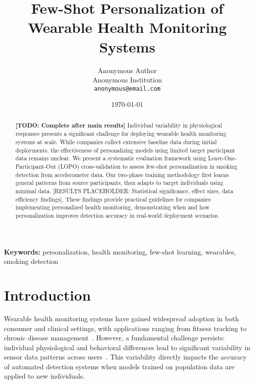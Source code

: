 \documentclass[twocolumn]{article}
\title{Few-Shot Personalization of Wearable Health Monitoring Systems}
\author{
    Anonymous Author\\
    Anonymous Institution\\
    \texttt{anonymous@email.com}
}
\date{\today}
\begin{document}
\maketitle

\begin{abstract}

\textbf{[TODO: Complete after main results]}
Individual variability in physiological responses presents a significant challenge for deploying wearable health monitoring systems at scale. While companies collect extensive baseline data during initial deployments, the effectiveness of personalizing models using limited target participant data remains unclear. We present a systematic evaluation framework using Leave-One-Participant-Out (LOPO) cross-validation to assess few-shot personalization in smoking detection from accelerometer data. Our two-phase training methodology first learns general patterns from source participants, then adapts to target individuals using minimal data. [RESULTS PLACEHOLDER: Statistical significance, effect sizes, data efficiency findings]. These findings provide practical guidelines for companies implementing personalized health monitoring, demonstrating when and how personalization improves detection accuracy in real-world deployment scenarios.
\end{abstract}

\textbf{Keywords:} personalization, health monitoring, few-shot learning, wearables, smoking detection

\section{Introduction}
\label{sec:introduction}


Wearable health monitoring systems have gained widespread adoption in both consumer and clinical settings, with applications ranging from fitness tracking to chronic disease management~\cite{TODO:wearables_review}. However, a fundamental challenge persists: individual physiological and behavioral differences lead to significant variability in sensor data patterns across users~\cite{TODO:individual_variability}. This variability directly impacts the accuracy of automated detection systems when models trained on population data are applied to new individuals.
\end{document}
